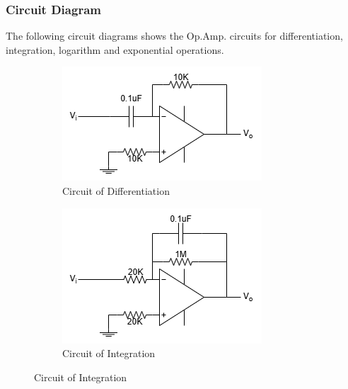     \subsubsection{Circuit Diagram}
        The following circuit diagrams shows the Op.Amp. circuits for differentiation, integration, logarithm and exponential operations.
        \begin{figure}[H]
            \centering
            \begin{subfigure}{0.4\textwidth}
                \includegraphics[width=1\linewidth]{Experiment_11/Circuit/Lab11a.drawio.png}
                \caption{Circuit of Differentiation}
                \label{cir:diff}
            \end{subfigure}
            \begin{subfigure}{0.4\textwidth}
                \includegraphics[width=1\linewidth]{Experiment_11/Circuit/Lab11b.drawio.png}
                \caption{Circuit of Integration}
                \label{cir:int}
            \end{subfigure}


\end{figure}
